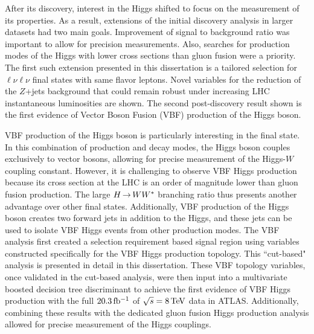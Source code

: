 After its discovery, interest in the Higgs shifted to focus on the measurement of its properties. As a result, extensions of the initial discovery analysis in larger datasets had two main goals. Improvement of signal to background ratio was important to allow for precision measurements. Also, searches for production modes of the Higgs with lower cross sections than gluon fusion were a priority. The first such extension presented in this dissertation is a tailored selection for $\ell\nu\ell\nu$ final states with same flavor leptons. Novel variables for the reduction of the $Z$+jets background that could remain robust under increasing LHC instantaneous luminosities are shown. The second post-discovery result shown is the first evidence of Vector Boson Fusion (VBF) production of the Higgs boson. 

VBF production of the Higgs boson is particularly interesting in the \HWWfull final state. In this combination of production and decay modes, the Higgs boson couples exclusively to vector bosons, allowing for precise measurement of the Higgs-$W$ coupling constant. However, it is challenging to observe VBF Higgs production because its cross section at the LHC is an order of magnitude lower than gluon fusion production. The large $H{\,{\rightarrow}\,}WW^\ast$ branching ratio thus presents another advantage over other final states. Additionally, VBF production of the Higgs boson creates two forward jets in addition to the Higgs, and these jets can be used to isolate VBF Higgs events from other production modes. The VBF \HWWfull analysis first created a selection requirement based signal region using variables constructed specifically for the VBF Higgs production topology. This ``cut-based" analysis is presented in detail in this dissertation. These VBF topology variables, once validated in the cut-based analysis, were then input into a multivariate boosted decision tree discriminant to achieve the first evidence of VBF Higgs production with the full $20.3 \mbox{\,fb$^{-1}$}$ of $\sqrt{s} = 8 \TeV$ data in ATLAS. Additionally, combining these results with the dedicated gluon fusion Higgs production analysis allowed for precise measurement of the Higgs couplings. 

